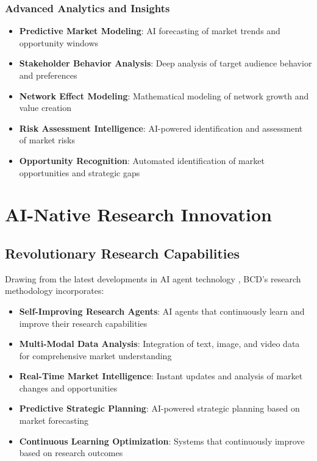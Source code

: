 \documentclass[12pt,a4paper]{book}
\begin{document}
\subsubsection{Advanced Analytics and Insights}

\begin{itemize}
    \item \textbf{Predictive Market Modeling}: AI forecasting of market trends and opportunity windows
    \item \textbf{Stakeholder Behavior Analysis}: Deep analysis of target audience behavior and preferences
    \item \textbf{Network Effect Modeling}: Mathematical modeling of network growth and value creation
    \item \textbf{Risk Assessment Intelligence}: AI-powered identification and assessment of market risks
    \item \textbf{Opportunity Recognition}: Automated identification of market opportunities and strategic gaps
\end{itemize}

\section{AI-Native Research Innovation}

\subsection{Revolutionary Research Capabilities}

Drawing from the latest developments in AI agent technology \citep{reiff_multiagent_sophisticated_system}, BCD's research methodology incorporates:

\begin{itemize}
    \item \textbf{Self-Improving Research Agents}: AI agents that continuously learn and improve their research capabilities
    \item \textbf{Multi-Modal Data Analysis}: Integration of text, image, and video data for comprehensive market understanding
    \item \textbf{Real-Time Market Intelligence}: Instant updates and analysis of market changes and opportunities
    \item \textbf{Predictive Strategic Planning}: AI-powered strategic planning based on market forecasting
    \item \textbf{Continuous Learning Optimization}: Systems that continuously improve based on research outcomes
\end{itemize}
\end{document}

